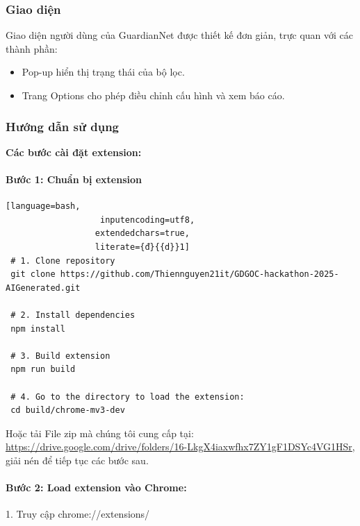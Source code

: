 \documentclass[12pt,a4paper]{article}
\begin{document}
\subsubsection{Giao diện}

Giao diện người dùng của GuardianNet được thiết kế đơn giản, trực quan với các thành phần:
\begin{itemize}
  \item Pop-up hiển thị trạng thái của bộ lọc.
  \item Trang Options cho phép điều chỉnh cấu hình và xem báo cáo.
\end{itemize}

\subsubsection{Hướng dẫn sử dụng}

\textbf{Các bước cài đặt extension:}

\paragraph{Bước 1: Chuẩn bị extension}\mbox{}

\begin{lstlisting}[language=bash,
                   inputencoding=utf8,
                  extendedchars=true,
                  literate={đ}{{d}}1]
 # 1. Clone repository
 git clone https://github.com/Thiennguyen21it/GDGOC-hackathon-2025-AIGenerated.git
 
 # 2. Install dependencies
 npm install
 
 # 3. Build extension
 npm run build

 # 4. Go to the directory to load the extension:
 cd build/chrome-mv3-dev
\end{lstlisting}
                

Hoặc tải File zip mà chúng tôi cung cấp tại: \\ 
\url{https://drive.google.com/drive/folders/16-LkgX4iaxwfhx7ZY1gF1DSYc4VG1HSr}, giải nén để tiếp tục các bước sau.

\paragraph{Bước 2: Load extension vào Chrome:}\mbox{}

1. Truy cập chrome://extensions/
\end{document}
